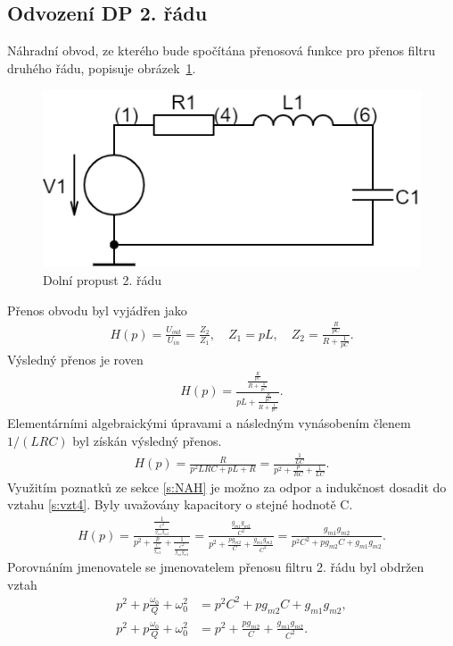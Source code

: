 \subsection{Odvození DP 2. řádu}\label{s:ODV}
\noindent Náhradní obvod, ze kterého bude spočítána přenosová funkce pro přenos filtru druhého řádu, popisuje obrázek~\ref{s:DPO}.
\begin{figure}[h]
\centering
\includegraphics[scale=0.3]{circuit(2).png}
\caption{Dolní propust 2. řádu \label{s:DPO}} 
\end{figure}
\noindent Přenos obvodu byl vyjádřen jako
\begin{align}
H(p) = \frac{U_{out}}{U_{in}} = \frac{Z_2}{Z_1}, \quad Z_1 = pL,\quad Z_2 = \frac{\frac{R}{pC}}{R + \frac{1}{pC}}.
\end{align}
Výsledný přenos je roven 
\begin{align}
H(p) = \frac{\frac{\frac{R}{pC}}{R + \frac{1}{pC}}}{pL + \frac{\frac{R}{pC}}{R + \frac{1}{pC}}}.
\end{align}
Elementárními algebraickými úpravami a následným vynásobením členem $1/(LRC)$ byl získán výsledný přenos.
\begin{align}\label{s:vzt4}
H(p) = \frac{R}{p^2LRC + pL + R} = \frac{\frac{1}{LC}}{p^2 + \frac{p}{RC} + \frac{1}{LC}}.
\end{align}
\noindent Využitím poznatků ze sekce \ref{s:NAH} je možno za odpor a indukčnost dosadit do vztahu \ref{s:vzt4}. Byly uvažovány kapacitory o stejné hodnotě C.
\begin{align}
H(p) = \frac{\frac{1}{\frac{C^2}{g_{m1}g_{m2}}}}{p^2 + \frac{p}{\frac{C}{g_{m2}}} + \frac{1}{\frac{C^2}{g_{m1}g_{m2}}}} = \frac{\frac{g_{m1}g_{m2}}{C^2}}{p^2 + \frac{pg_{m2}}{C} + \frac{g_{m1}g_{m2}}{C^2}} = \frac{g_{m1}g_{m2}}{p^2C^2 + pg_{m2}C + g_{m1}g_{m2}}.
\end{align}
Porovnáním jmenovatele se jmenovatelem přenosu filtru 2. řádu byl obdržen vztah
\begin{align}
p^2 + p\frac{\omega _0}{Q} + \omega _0^2 &= p^2C^2 + pg_{m2}C + g_{m1}g_{m2},\\
p^2 + p\frac{\omega _0}{Q} + \omega _0^2 &= p^2 + \frac{pg_{m2}}{C} + \frac{g_{m1}g_{m2}}{C^2}.
\end{align}
